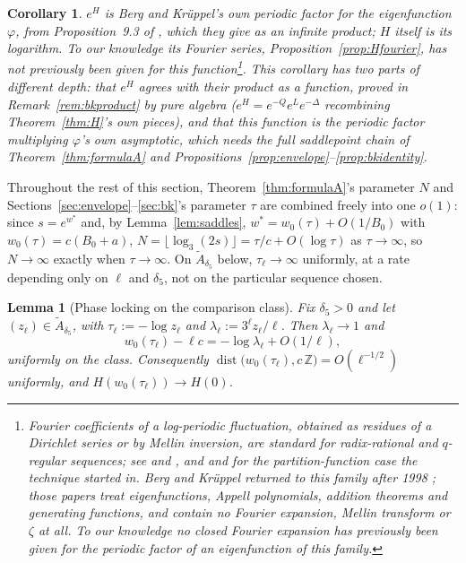 \documentclass[11pt]{article}
\newtheorem{lemma}[theorem]{Lemma}
\newtheorem{corollary}[theorem]{Corollary}
\theoremstyle{definition}
\theoremstyle{remark}
\newcommand{\Z}{\mathbb{Z}}
\begin{document}
\begin{corollary}
\label{cor:bk}
$e^H$ is Berg and Kr\"uppel's own periodic factor for the eigenfunction $\varphi$, from
Proposition~9.3 of \cite{BergKruppel1998}, which they give as an infinite product; $H$ itself is
its logarithm. To our knowledge its Fourier series, Proposition~\ref{prop:Hfourier}, has not
previously been given for this
function\footnote{Fourier coefficients of a log-periodic fluctuation, obtained as residues of a
Dirichlet series or by Mellin inversion, are standard for radix-rational and $q$-regular
sequences; see \cite{Dumas2008} and \cite{HeubergerKrenn2018}, and \cite{DeBruijn1948} and
\cite{ErdosRichmond1976} for the partition-function case the technique started in. Berg and Kr\"uppel returned to this family
after 1998 \cite{BergKruppel2000,BergKruppel2001}; those papers treat eigenfunctions, Appell
polynomials, addition theorems and generating functions, and contain no Fourier expansion, Mellin
transform or $\zeta$ at all. To our knowledge no closed Fourier expansion has previously been
given for the periodic factor of an eigenfunction of this family.}. This corollary
has two parts of different depth: that $e^H$ agrees with their product \emph{as a function},
proved in Remark~\ref{rem:bkproduct} by pure algebra ($e^H=e^{-Q}e^Le^{-\Delta}$ recombining
Theorem~\ref{thm:H}'s own pieces), and that this function is the periodic factor
multiplying $\varphi$'s own asymptotic, which needs the full saddlepoint chain of
Theorem~\ref{thm:formulaA} and Propositions~\ref{prop:envelope}--\ref{prop:bkidentity}.
\end{corollary}

Throughout the rest of this section, Theorem~\ref{thm:formulaA}'s parameter $N$ and
Sections~\ref{sec:envelope}--\ref{sec:bk}'s parameter $\tau$ are combined freely into one $o(1)$:
since $s=e^{w^*}$ and, by Lemma~\ref{lem:saddles}, $w^*=w_0(\tau)+O(1/B_0)$ with
$w_0(\tau)=c(B_0+a)$, $N=\lfloor\log_3(2s)\rfloor = \tau/c+O(\log\tau)$ as $\tau\to\infty$, so
$N\to\infty$ exactly when $\tau\to\infty$. On $\widetilde{A}_{\delta_5}$ below, $\tau_\ell\to\infty$
uniformly, at a rate depending only on $\ell$ and $\delta_5$, not on the particular sequence chosen.

\begin{lemma}[Phase locking on the comparison class]
\label{lem:phaselock}
Fix $\delta_5>0$ and let $(z_\ell)\in\widetilde A_{\delta_5}$, with
$\tau_\ell:=-\log z_\ell$ and $\lambda_\ell:=3^\ell z_\ell/\ell$. Then
$\lambda_\ell\to1$ and
\[
 w_0(\tau_\ell)-\ell c=-\log\lambda_\ell+O(1/\ell),
\]
uniformly on the class. Consequently
$\operatorname{dist}\bigl(w_0(\tau_\ell),c\,\Z\bigr)=O(\ell^{-1/2})$
uniformly, and $H(w_0(\tau_\ell))\to H(0)$.
\end{lemma}
\end{document}
